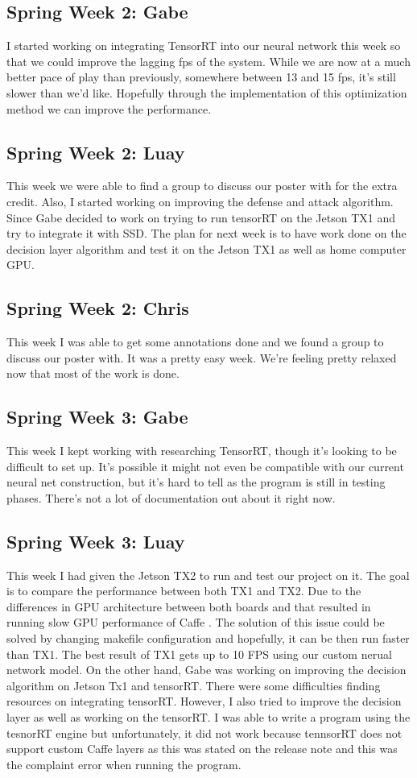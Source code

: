 \documentclass[onecolumn, draftclsnofoot,10pt, compsoc]{IEEEtran}
\begin{document}
\subsection{Spring Week 2: Gabe}
I started working on integrating TensorRT into our neural network this week so that we could improve the lagging fps of the system. While we are now at a much better pace of play than previously, somewhere between 13 and 15 fps, it's still slower than we'd like. Hopefully through the implementation of this optimization method we can improve the performance.
\subsection{Spring Week 2: Luay}
This week we were able to find a group to discuss our poster with for the extra credit. Also, I started working on improving the defense and attack algorithm. Since Gabe decided to work on trying to run tensorRT on the Jetson TX1 and try to integrate it with SSD. The plan for next week is to have work done on the decision layer algorithm and test it on the Jetson TX1 as well as home computer GPU.
\subsection{Spring Week 2: Chris}
This week I was able to get some annotations done and we found a group to discuss our poster with. It was a pretty easy week. We're feeling pretty relaxed now that most of the work is done.
\subsection{Spring Week 3: Gabe}
This week I kept working with researching TensorRT, though it's looking to be difficult to set up. It's possible it might not even be compatible with our current neural net construction, but it's hard to tell as the program is still in testing phases. There's not a lot of documentation out about it right now.
\subsection{Spring Week 3: Luay}
This week I had given the Jetson TX2 to run and test our project on it. The goal is to compare the performance between both TX1 and TX2. Due to the differences in GPU architecture between both boards and that resulted in running slow GPU performance of Caffe . The solution of this issue could be solved by changing makefile configuration and hopefully, it can be then run faster than TX1. The best result of TX1 gets up to 10 FPS using our custom nerual network model. On the other hand, Gabe was working on improving the decision algorithm on Jetson Tx1 and tensorRT. There were some difficulties finding resources on integrating tensorRT. However, I also tried to improve the decision layer as well as working on the tensorRT. I was able to write a program using the tesnorRT engine but unfortunately, it did not work because tennsorRT does not support custom Caffe layers as this was stated on the release note and this was the complaint error when running the program.
\end{document}

